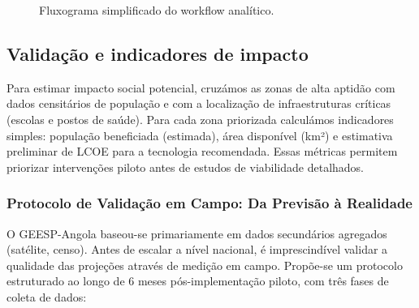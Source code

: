 \documentclass[12pt, a4paper]{article}
\begin{document}
\begin{figure}[H]
\centering
{}
\caption{Fluxograma simplificado do workflow analítico.}
\label{fig:fluxograma}
\end{figure}

\subsection{Validação e indicadores de impacto}

Para estimar impacto social potencial, cruzámos as zonas de alta aptidão com dados censitários de população e com a localização de infraestruturas críticas (escolas e postos de saúde). Para cada zona priorizada calculámos indicadores simples: população beneficiada (estimada), área disponível (km²) e estimativa preliminar de LCOE para a tecnologia recomendada. Essas métricas permitem priorizar intervenções piloto antes de estudos de viabilidade detalhados.

\subsubsection{Protocolo de Validação em Campo: Da Previsão à Realidade}

O GEESP-Angola baseou-se primariamente em dados secundários agregados (satélite, censo). 
Antes de escalar a nível nacional, é imprescindível validar a qualidade das projeções 
através de medição em campo. Propõe-se um protocolo estruturado ao longo de 6 meses 
pós-implementação piloto, com três fases de coleta de dados:
\end{document}
